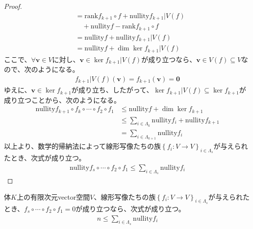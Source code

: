 \documentclass[dvipdfmx]{jsarticle}
\begin{document}
\begin{proof}
\begin{align*}
&= {\mathrm{rank}}{f_{k + 1} \circ f} + {\mathrm{nullity}}{f_{k + 1}|V(f)} \\
&\quad + {\mathrm{nullity}}f - {\mathrm{rank}}{f_{k + 1} \circ f}\\
&= {\mathrm{nullity}}f + {\mathrm{nullity}}{f_{k + 1}|V(f)}\\
&= {\mathrm{nullity}}f + \dim{\ker{f_{k + 1}|V(f)}}
\end{align*}
ここで、$\forall\mathbf{v} \in V$に対し、$\mathbf{v} \in \ker{f_{k + 1}|V(f)}$が成り立つなら、$\mathbf{v} \in V(f) \subseteq V$なので、次のようになる。
\begin{align*}
f_{k + 1}|V(f)\left( \mathbf{v} \right) = f_{k + 1}\left( \mathbf{v} \right) = \mathbf{0}
\end{align*}
ゆえに、$\mathbf{v} \in \ker f_{k + 1}$が成り立ち、したがって、$\ker{f_{k + 1}|V(f)} \subseteq \ker f_{k + 1}$が成り立つことから、次のようになる。
\begin{align*}
{\mathrm{nullity}}{f_{k + 1} \circ f_{k} \circ \cdots \circ f_{2} \circ f_{1}} &\leq {\mathrm{nullity}}f + \dim{\ker f_{k + 1}}\\
&\leq \sum_{i \in \varLambda_{k}} {{\mathrm{nullity}}f_{i}} + {\mathrm{nullity}}f_{k + 1}\\
&= \sum_{i \in \varLambda_{k + 1}} {{\mathrm{nullity}}f_{i}}
\end{align*}
以上より、数学的帰納法によって線形写像たちの族$\left\{ f_{i}:V \rightarrow V \right\}_{i \in \varLambda_{s}}$が与えられたとき、次式が成り立つ。
\begin{align*}
{\mathrm{nullity}}{f_{s} \circ \cdots \circ f_{2} \circ f_{1}} \leq \sum_{i \in \varLambda_{s}} {{\mathrm{nullity}}f_{i}}
\end{align*}
\end{proof}
\begin{thm}
\label{2.2.4.7}
体$K$上の有限次元vector空間$V$、線形写像たちの族$\left\{ f_{i}:V \rightarrow V \right\}_{i \in \varLambda_{s}}$が与えられたとき、$f_{s} \circ \cdots \circ f_{2} \circ f_{1} = 0$が成り立つなら、次式が成り立つ。
\begin{align*}
n \leq \sum_{i \in \varLambda_{s}} {{\mathrm{nullity}}f_{i}}
\end{align*}
\end{thm}
\end{document}
